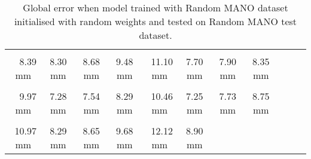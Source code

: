 \begin{table}[!ht]
    \begin{tabular}{|c|c|c|c|c|c|c|c|c|c|c|}
    \hline
    \cellcolor[HTML]{00ff00}{\bfseries Wrist} & \cellcolor[HTML]{00ff00}{\bfseries IMCP} & \cellcolor[HTML]{00ff00}{\bfseries IPIP} & \cellcolor[HTML]{00ff00}{\bfseries IDIP} & \cellcolor[HTML]{40ff00}{\bfseries ITIP} & \cellcolor[HTML]{00ff00}{\bfseries MMCP} & \cellcolor[HTML]{00ff00}{\bfseries MPIP} & \cellcolor[HTML]{00ff00}{\bfseries MDIP}  \\
    \cellcolor[HTML]{00ff00}$\,\,\,\,\,\,$8.39 mm & \cellcolor[HTML]{00ff00}$\,\,\,\,\,\,$8.30 mm & \cellcolor[HTML]{00ff00}$\,\,\,\,\,\,$8.68 mm & \cellcolor[HTML]{00ff00}$\,\,\,\,\,\,$9.48 mm & \cellcolor[HTML]{40ff00}$\,\,\,$11.10 mm & \cellcolor[HTML]{00ff00}$\,\,\,\,\,\,$7.70 mm & \cellcolor[HTML]{00ff00}$\,\,\,\,\,\,$7.90 mm & \cellcolor[HTML]{00ff00}$\,\,\,\,\,\,$8.35 mm\\
    \hline
    \cellcolor[HTML]{00ff00}{\bfseries MTIP} & \cellcolor[HTML]{00ff00}{\bfseries RMCP} & \cellcolor[HTML]{00ff00}{\bfseries RPIP} & \cellcolor[HTML]{00ff00}{\bfseries RDIP} & \cellcolor[HTML]{40ff00}{\bfseries RTIP} & \cellcolor[HTML]{00ff00}{\bfseries PMCP} & \cellcolor[HTML]{00ff00}{\bfseries PPIP} & \cellcolor[HTML]{00ff00}{\bfseries PDIP}  \\
    \cellcolor[HTML]{00ff00}$\,\,\,\,\,\,$9.97 mm & \cellcolor[HTML]{00ff00}$\,\,\,\,\,\,$7.28 mm & \cellcolor[HTML]{00ff00}$\,\,\,\,\,\,$7.54 mm & \cellcolor[HTML]{00ff00}$\,\,\,\,\,\,$8.29 mm & \cellcolor[HTML]{40ff00}$\,\,\,$10.46 mm & \cellcolor[HTML]{00ff00}$\,\,\,\,\,\,$7.25 mm & \cellcolor[HTML]{00ff00}$\,\,\,\,\,\,$7.73 mm & \cellcolor[HTML]{00ff00}$\,\,\,\,\,\,$8.75 mm\\
    \hline
    \cellcolor[HTML]{40ff00}{\bfseries PTIP} & \cellcolor[HTML]{00ff00}{\bfseries TMCP} & \cellcolor[HTML]{00ff00}{\bfseries TPIP} & \cellcolor[HTML]{00ff00}{\bfseries PDIP} & \cellcolor[HTML]{40ff00}{\bfseries TTIP} & \cellcolor[HTML]{00ff00}{\bfseries Average}  \\
    \cellcolor[HTML]{40ff00}$\,\,\,$10.97 mm & \cellcolor[HTML]{00ff00}$\,\,\,\,\,\,$8.29 mm & \cellcolor[HTML]{00ff00}$\,\,\,\,\,\,$8.65 mm & \cellcolor[HTML]{00ff00}$\,\,\,\,\,\,$9.68 mm & \cellcolor[HTML]{40ff00}$\,\,\,$12.12 mm & \cellcolor[HTML]{00ff00}$\,\,\,\,\,\,$8.90 mm \\
    \cline{1-6}
    \end{tabular}
    \caption{Global error when model trained with Random MANO dataset initialised with random weights and tested on Random MANO test dataset.}
    \label{tb:orog}
    \end{table}

